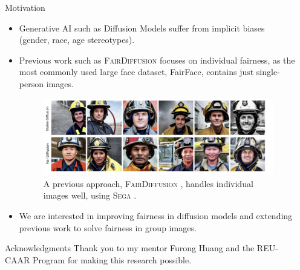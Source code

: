 \documentclass[final]{beamer}
\newlength{\sepwid}
\newlength{\onecolwid}
\begin{document}
\begin{frame}[t]
\begin{columns}[t]
\begin{column}{\onecolwid}
\begin{block}{Motivation}
\begin{itemize}
\item Generative AI such as Diffusion Models suffer from implicit biases (gender, race, age stereotypes).

\item Previous work such as \textsc{FairDiffusion} focuses on individual fairness, as the most commonly used large face dataset, FairFace, contains just single-person images.

\begin{center}
\begin{figure}
\includegraphics[scale=1.25]{FairDiffusionFirefighterOutput.png}
\captionsetup{justification=centering}
\caption{A previous approach, \textsc{FairDiffusion} \cite{friedrich2023fair}, handles individual images well, using \textsc{Sega} \cite{brack2023sega}.}
\end{figure}
\end{center}

\vspace{-1cm}

\item We are interested in improving fairness in diffusion models and extending previous work to solve fairness in group images.
\end{itemize}    
\end{block}

\begin{block}{Acknowledgments}
Thank you to my mentor Furong Huang and the REU-CAAR Program for making this research possible.
\end{block}





\end{column} %

\begin{column}{\sepwid}\end{column} %


\end{columns}
\end{frame}
\end{document}
